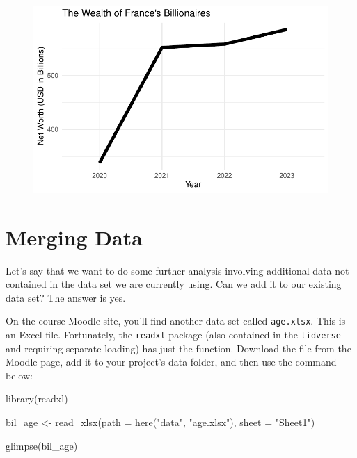 \documentclass[
  letterpaper,
]{book}
\newenvironment{Shaded}{\begin{snugshade}}{\end{snugshade}}
\newcommand{\AttributeTok}[1]{\textcolor[rgb]{0.40,0.45,0.13}{#1}}
\newcommand{\FunctionTok}[1]{\textcolor[rgb]{0.28,0.35,0.67}{#1}}
\newcommand{\NormalTok}[1]{\textcolor[rgb]{0.00,0.23,0.31}{#1}}
\newcommand{\OtherTok}[1]{\textcolor[rgb]{0.00,0.23,0.31}{#1}}
\newcommand{\StringTok}[1]{\textcolor[rgb]{0.13,0.47,0.30}{#1}}
\begin{document}
\begin{figure}[H]

{\centering \includegraphics{workflows-and-wrangling_files/figure-pdf/unnamed-chunk-15-1.pdf}

}

\end{figure}

\hypertarget{merging-data}{%
\section{Merging Data}\label{merging-data}}

Let's say that we want to do some further analysis involving additional
data not contained in the data set we are currently using. Can we add it
to our existing data set? The answer is yes.

On the course Moodle site, you'll find another data set called
\texttt{age.xlsx}. This is an Excel file. Fortunately, the
\texttt{readxl} package (also contained in the \texttt{tidverse} and
requiring separate loading) has just the function. Download the file
from the Moodle page, add it to your project's data folder, and then use
the command below:

\begin{Shaded}
\begin{Highlighting}[]
\FunctionTok{library}\NormalTok{(readxl)}

\NormalTok{bil\_age }\OtherTok{\textless{}{-}} \FunctionTok{read\_xlsx}\NormalTok{(}\AttributeTok{path =} \FunctionTok{here}\NormalTok{(}\StringTok{"data"}\NormalTok{, }\StringTok{"age.xlsx"}\NormalTok{), }\AttributeTok{sheet =} \StringTok{"Sheet1"}\NormalTok{)}

\FunctionTok{glimpse}\NormalTok{(bil\_age)}
\end{Highlighting}
\end{Shaded}
\end{document}
